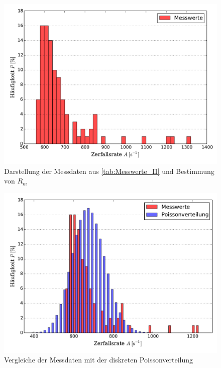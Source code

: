 	
	\begin{figure}[!h]
		\centering
		\includegraphics[scale=0.7]{Grafiken/AktivitaetHistogramm.pdf}
		\caption{Darstellung der Messdaten aus \cref{tab:Messwerte_II} und Bestimmung von $R_{m}$}
		\label{fig:Messdaten_III}
	\end{figure}
		
	\begin{figure}[!h]
		\centering
		\includegraphics[scale=0.7]{Grafiken/VergleichPoisson.pdf}
		\caption{Vergleiche der Messdaten mit der diskreten Poissonverteilung}
		\label{fig:Messdaten_III_Poisson}
	\end{figure}
	
